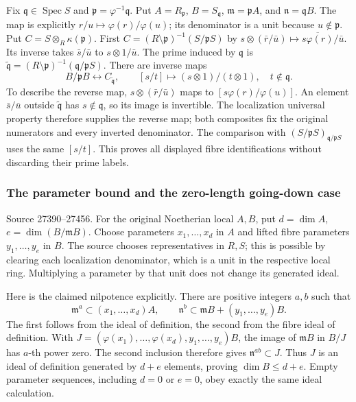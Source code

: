 Fix \(\mathfrak q\in\operatorname{Spec}S\) and \(\mathfrak p=\varphi^{-1}\mathfrak q\). Put \(A=R_{\mathfrak p}\), \(B=S_{\mathfrak q}\), \(\mathfrak m=\mathfrak pA\), and \(\mathfrak n=\mathfrak qB\). The map is explicitly \(r/u\mapsto\varphi(r)/\varphi(u)\); its denominator is a unit because \(u\notin\mathfrak p\). Put \(C=S\otimes_R\kappa(\mathfrak p)\). First \(C=(R\setminus\mathfrak p)^{-1}(S/\mathfrak pS)\) by \(s\otimes(\bar r/\bar u)\mapsto\overline{s\varphi(r)}/\bar u\). Its inverse takes \(\bar s/\bar u\) to \(s\otimes1/\bar u\). The prime induced by \(\mathfrak q\) is \(\tilde{\mathfrak q}=(R\setminus\mathfrak p)^{-1}
(\mathfrak q/\mathfrak pS)\). There are inverse maps \[
 B/\mathfrak pB\longleftrightarrow C_{\tilde{\mathfrak q}},
 \qquad
 [s/t]\longmapsto(s\otimes1)/(t\otimes1),\quad t\notin\mathfrak q.
\] To describe the reverse map, \(s\otimes(\bar r/\bar u)\) maps to \([s\varphi(r)/\varphi(u)]\). An element \(\bar s/\bar u\) outside \(\tilde{\mathfrak q}\) has \(s\notin\mathfrak q\), so its image is invertible. The localization universal property therefore supplies the reverse map; both composites fix the original numerators and every inverted denominator. The comparison with \((S/\mathfrak pS)_{\mathfrak q/\mathfrak pS}\) uses the same \([s/t]\). This proves all displayed fibre identifications without discarding their prime labels.

\subsubsection{The parameter bound and the zero-length going-down case}\label{algebra-proof-024-the-parameter-bound-and-the-zero-length-going-down-case}

Source 27390--27456. For the original Noetherian local \(A,B\), put \(d=\dim A\), \(e=\dim(B/\mathfrak mB)\). Choose parameters \(x_1,\ldots,x_d\) in \(A\) and lifted fibre parameters \(y_1,\ldots,y_e\) in \(B\). The source chooses representatives in \(R,S\); this is possible by clearing each localization denominator, which is a unit in the respective local ring. Multiplying a parameter by that unit does not change its generated ideal.

Here is the claimed nilpotence explicitly. There are positive integers \(a,b\) such that \[
 \mathfrak m^a\subset(x_1,\ldots,x_d)A,\qquad
 \mathfrak n^b\subset\mathfrak mB+(y_1,\ldots,y_e)B.
\] The first follows from the ideal of definition, the second from the fibre ideal of definition. With \(J=(\varphi(x_1),\ldots,\varphi(x_d),
y_1,\ldots,y_e)B\), the image of \(\mathfrak mB\) in \(B/J\) has \(a\)-th power zero. The second inclusion therefore gives \(\mathfrak n^{ab}\subset J\). Thus \(J\) is an ideal of definition generated by \(d+e\) elements, proving \(\dim B\leq d+e\). Empty parameter sequences, including \(d=0\) or \(e=0\), obey exactly the same ideal calculation.

